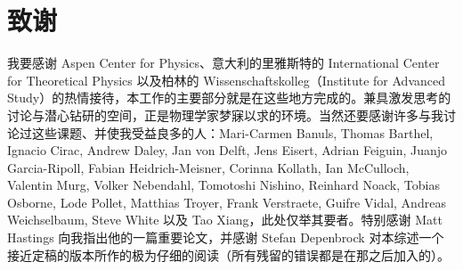 \section{致谢}
我要感谢 Aspen Center for Physics、意大利的里雅斯特的 International Center for Theoretical Physics 以及柏林的 Wissenschaftskolleg（Institute for Advanced Study）的热情接待，本工作的主要部分就是在这些地方完成的。兼具激发思考的讨论与潜心钻研的空间，正是物理学家梦寐以求的环境。当然还要感谢许多与我讨论过这些课题、并使我受益良多的人：Mari-Carmen Banuls, Thomas Barthel, Ignacio Cirac, Andrew Daley, Jan von Delft, Jens Eisert, Adrian Feiguin, Juanjo Garcia-Ripoll, Fabian Heidrich-Meisner, Corinna Kollath, Ian McCulloch, Valentin Murg, Volker Nebendahl, Tomotoshi Nishino, Reinhard Noack, Tobias Osborne, Lode Pollet, Matthias Troyer, Frank Verstraete, Guifre Vidal, Andreas Weichselbaum, Steve White 以及 Tao Xiang，此处仅举其要者。特别感谢 Matt Hastings 向我指出他的一篇重要论文，并感谢 Stefan Depenbrock 对本综述一个接近定稿的版本所作的极为仔细的阅读（所有残留的错误都是在那之后加入的）。

